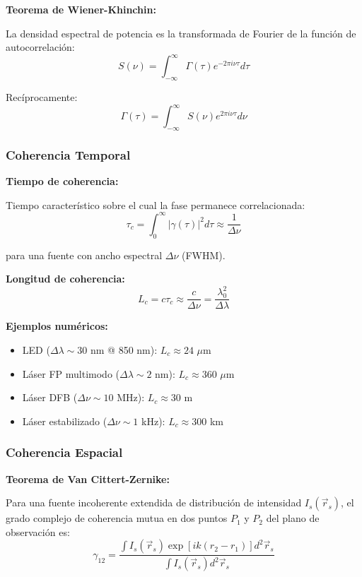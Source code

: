 \documentclass[11pt,a4paper]{article}
\begin{document}
\textbf{Teorema de Wiener-Khinchin:}

La densidad espectral de potencia es la transformada de Fourier de la función de autocorrelación:
\begin{equation}
    S(\nu) = \int_{-\infty}^{\infty} \Gamma(\tau)e^{-2\pi i\nu\tau}d\tau
\end{equation}

Recíprocamente:
\begin{equation}
    \Gamma(\tau) = \int_{-\infty}^{\infty} S(\nu)e^{2\pi i\nu\tau}d\nu
\end{equation}

\subsubsection{Coherencia Temporal}

\textbf{Tiempo de coherencia:}

Tiempo característico sobre el cual la fase permanece correlacionada:
\begin{equation}
    \tau_c = \int_0^\infty |\gamma(\tau)|^2 d\tau \approx \frac{1}{\Delta\nu}
\end{equation}

para una fuente con ancho espectral $\Delta\nu$ (FWHM).

\textbf{Longitud de coherencia:}
\begin{equation}
    L_c = c\tau_c \approx \frac{c}{\Delta\nu} = \frac{\lambda_0^2}{\Delta\lambda}
\end{equation}

\textbf{Ejemplos numéricos:}
\begin{itemize}
    \item LED ($\Delta\lambda \sim 30$ nm @ 850 nm): $L_c \approx 24$ $\mu$m
    \item Láser FP multimodo ($\Delta\lambda \sim 2$ nm): $L_c \approx 360$ $\mu$m
    \item Láser DFB ($\Delta\nu \sim 10$ MHz): $L_c \approx 30$ m
    \item Láser estabilizado ($\Delta\nu \sim 1$ kHz): $L_c \approx 300$ km
\end{itemize}

\subsubsection{Coherencia Espacial}

\textbf{Teorema de Van Cittert-Zernike:}

Para una fuente incoherente extendida de distribución de intensidad $I_s(\vec{r}_s)$, el grado complejo de coherencia mutua en dos puntos $P_1$ y $P_2$ del plano de observación es:
\begin{equation}
    \gamma_{12} = \frac{\int I_s(\vec{r}_s)\exp[ik(r_2 - r_1)]d^2\vec{r}_s}{\int I_s(\vec{r}_s)d^2\vec{r}_s}
\end{equation}
\end{document}
